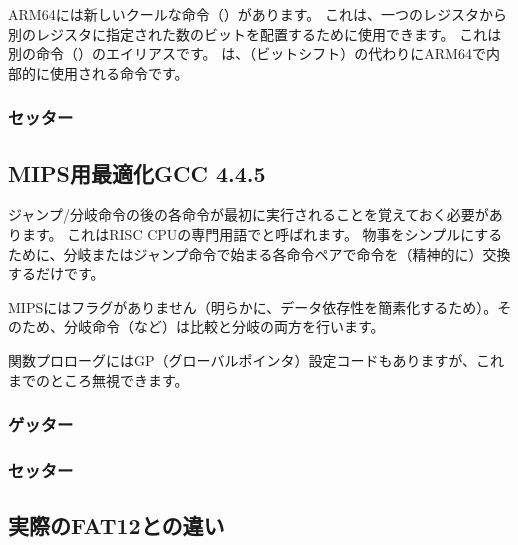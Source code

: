 

ARM64には新しいクールな命令（）があります。
これは、一つのレジスタから別のレジスタに指定された数のビットを配置するために使用できます。
これは別の命令（）のエイリアスです。
は、（ビットシフト）の代わりにARM64で内部的に使用される命令です。

\subsubsection{セッター}



\subsection{MIPS用最適化GCC 4.4.5}

ジャンプ/分岐命令の後の各命令が最初に実行されることを覚えておく必要があります。
これはRISC CPUの専門用語でと呼ばれます。
物事をシンプルにするために、分岐またはジャンプ命令で始まる各命令ペアで命令を（精神的に）交換するだけです。

MIPSにはフラグがありません（明らかに、データ依存性を簡素化するため）。そのため、分岐命令（など）は比較と分岐の両方を行います。

関数プロローグにはGP（グローバルポインタ）設定コードもありますが、これまでのところ無視できます。

\subsubsection{ゲッター}



\subsubsection{セッター}



\subsection{実際のFAT12との違い}


